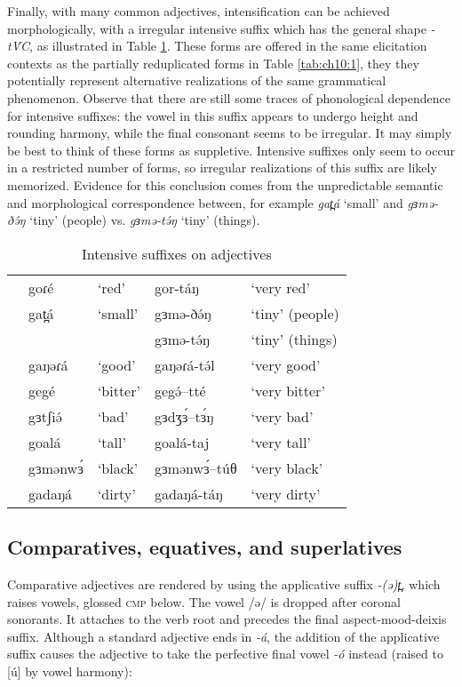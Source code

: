 Finally, with many common adjectives, intensification can be achieved morphologically, with a irregular intensive suffix which has the general shape \textit{-tV́C}, as illustrated in Table \ref{tab:ch10:2}. These forms are offered in the same elicitation contexts as the partially reduplicated forms in Table \ref{tab:ch10:1}, they they potentially represent alternative realizations of the same grammatical phenomenon. Observe that there are still some traces of phonological dependence for intensive suffixes: the vowel in this suffix appears to undergo height and rounding harmony, while the final consonant seems to be irregular. It may simply be best to think of these forms as suppletive. Intensive suffixes only seem to occur in a restricted number of forms, so irregular realizations of this suffix are likely memorized. Evidence for this conclusion comes from the unpredictable semantic and morphological correspondence between, for example \textit{gat̪á} `small' and \textit{gɜmə-ðə́ŋ }‘tiny’ (people)  vs. 	\textit{gɜmə-tə́ŋ}	‘tiny’ (things).

\begin{table}
\begin{tabular}{lllll}
&	goɾé&	‘red’		&	gor-táŋ			&	`very red'\\
&	gat̪á	&	‘small’		&	gɜmə-ðə́ŋ			&	‘tiny’ (people)\\
&			&			&	gɜmə-tə́ŋ			&	‘tiny’ (things)\\
&	gaŋəɾá	&	‘good’	&	gaŋəɾá-tə́l		&	‘very good’\\
&	gegé	&	‘bitter’&	gegə́--tté		&	‘very bitter’\\
&	gɜtʃiə́	&	‘bad’	&	gɜdʒɜ́--tɜ́ŋ		&	‘very bad’ \\
&	goalá	&	‘tall’	&	goalá-taj		&	`very tall'\\
&	gɜmənwɜ́	&	‘black’	&	gɜmənwɜ́--túθ		&	`very black'\\
&	gadaŋá	&	‘dirty’	&	gadaŋá-táŋ		&	‘very dirty’\\
\end{tabular}	
\caption{Intensive suffixes on adjectives}
\label{tab:ch10:2}
\end{table}



\subsection{Comparatives, equatives, and superlatives}\label{sec:ch10:comp}

Comparative adjectives are rendered by using the applicative suffix \textit{-(ə)t̪,} which raises vowels, glossed \textsc{\textsc{cmp}} below. The vowel /ə/ is dropped after coronal sonorants. It attaches to the verb root and precedes the final aspect-mood-deixis suffix. Although a standard adjective ends in \textit{-á}, the addition of the applicative suffix causes the adjective to take the perfective final vowel \textit{-ó} instead (raised to [ú] by vowel harmony):

